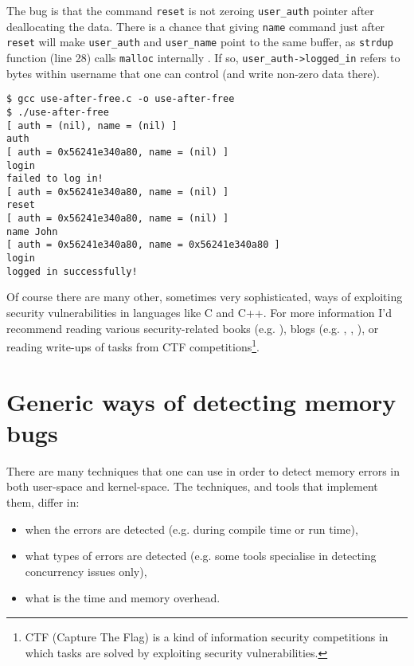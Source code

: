 \documentclass[shortabstract, manyadvisors, english, mgr]{iithesis}
\theoremstyle{definition} \newtheorem*{definition}{Definicja}
\theoremstyle{definition} \newtheorem*{example}{Przykład}
\theoremstyle{definition} \newtheorem*{remark}{Uwaga}
\begin{document}
The bug is that the command \texttt{reset} is not zeroing \texttt{user\_auth} pointer after deallocating the data. There is a chance that giving \texttt{name} command just after \texttt{reset} will make \texttt{user\_auth} and \texttt{user\_name} point to the same buffer, as \texttt{strdup} function (line 28) calls \texttt{malloc} internally \cite{bib:strdup}. If so, \texttt{user\_auth->logged\_in} refers to bytes within username that one can control (and write non-zero data there).

\begin{lstlisting}[caption={Exploiting use-after-free bug in listing \ref{lst:use-after-free}. Note that after \texttt{name} command both pointers have the same value.}]
$ gcc use-after-free.c -o use-after-free
$ ./use-after-free
[ auth = (nil), name = (nil) ]
auth
[ auth = 0x56241e340a80, name = (nil) ]
login
failed to log in!
[ auth = 0x56241e340a80, name = (nil) ]
reset
[ auth = 0x56241e340a80, name = (nil) ]
name John
[ auth = 0x56241e340a80, name = 0x56241e340a80 ]
login
logged in successfully!
\end{lstlisting}

Of course there are many other, sometimes very sophisticated, ways of exploiting security vulnerabilities in languages like C and C++. For more information I'd recommend reading various security-related books (e.g. \cite{bib:secure-c-cpp}), blogs (e.g. \cite{bib:gynvael-blog}, \cite{bib:project-zero}, \cite{bib:mazur}), or reading write-ups of tasks from CTF competitions\footnote{CTF (Capture The Flag) is a kind of information security competitions in which tasks are solved by exploiting security vulnerabilities.}.

\section{Generic ways of detecting memory bugs}
There are many techniques that one can use in order to detect memory errors in both user-space and kernel-space. The techniques, and tools that implement them, differ in:
\begin{itemize}
    \item when the errors are detected (e.g. during compile time or run time),
    \item what types of errors are detected (e.g. some tools specialise in detecting concurrency issues only),
    \item what is the time and memory overhead.
\end{itemize}
\end{document}
